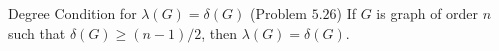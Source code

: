 
\begin{frame}
  \begin{exampleblock}{Degree Condition for $\lambda(G) = \delta(G)$ (Problem $5.26$)}
    If $G$ is graph of order $n$ such that $\delta(G) \ge (n-1)/2$, then $\lambda(G) = \delta(G)$.
  \end{exampleblock}
\end{frame}
